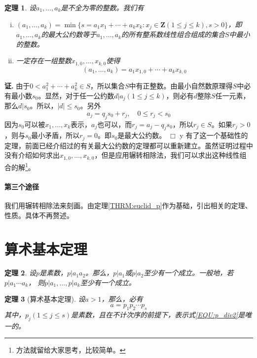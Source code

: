 \documentclass{ctexrep}
\newcommand{\aabs}[1]{{ \left| #1 \right| }}
\newcommand{\Z}{\boldsymbol{Z}}
\newtheorem{thrm}{定理}[section]
\renewenvironment{proof}[1][证]{\noindent \textbf{#1.} }{\hfill$\Box$}
\begin{document}
\begin{thrm}
设$a_1,\dotsc,a_k$是不全为零的整数。我们有
\begin{enumerate}[(i)]
\item $(a_1,\dotsc,a_k)=\min\{s=a_1x_1+\dotsb+a_k x_k : x_j\in \Z(1\leq j\leq k),s>0\}$，即$a_1,\dotsc,a_k$的最大公约数等于$a_1,\dotsc,a_k$的所有整系数线性组合组成的集合$S$中最小的整数。
\item 一定存在一组整数$x_{1,0},\dotsc,x_{k,0}$使得
\begin{equation}
(a_1,\dotsc,a_k)=a_1 x_{1,0}+\dotsb+a_k x_{k,0}
\end{equation}
\end{enumerate}
\end{thrm}
\begin{proof}
由于$0<a_1^2 +\dotsb+a_k^2\in S$，所以集合$S$中有正整数。由最小自然数原理得$S$中必有最小数$s_0$。显然，对于任一公约数$d|a_j(1\leq j\leq k)$，则必有$d$整除$S$任一元素，那么$d|s_0$。所以，$\aabs{d}\leq s_0$。另外
\begin{displaymath}
a_j=q_j s_0+r_j,\quad 0\leq r_j<s_0
\end{displaymath}
因为$s_0$可以被$x_1,\dotsc,x_k$表示，$a_j$也可以，而$r_j=a_j-q_j s_0$，所以$r_j\in S$。如果$r_j>0$，则与$s_0$最小矛盾，所以$r_j=0$。即$s_0$是最大公约数。
\end{proof}
y
有了这一个基础性的定理，前面已经介绍过的有关最大公约数的定理都可以重新建立。虽然证明过程中没有介绍如何求出$x_{1,0},\dotsc,x_{k,0}$，但是应用辗转相除法，我们可以求出这种线性组合的解\footnote{方法就留给大家思考，比较简单。}。

\paragraph{第三个途径}
我们用辗转相除法来刻画。由定理\ref{THRM:euclid_p}作为基础，引出相关的定理、性质。具体不再赘述。

\section{算术基本定理}

\begin{thrm}
设$p$是素数，$p|a_1 a_2$。那么，$p|a_1$或$p|a_2$至少有一个成立。一般地，若$p|a_1 \dotsm a_k$，
则$p|a_1, \dotsc , p|a_k$至少有一个成立。
\end{thrm}

\begin{thrm}[算术基本定理]
设$a>1$，那么，必有
\begin{equation}\label{EQU:p_div2}
a=p_1 p_2 \dotsm p_s
\end{equation}
其中，$p_j (1 \leq j \leq s)$是素数，且在不计次序的前提下，表示式\ref{EQU:p_div2}是唯一的。
\end{thrm}
\end{document}
